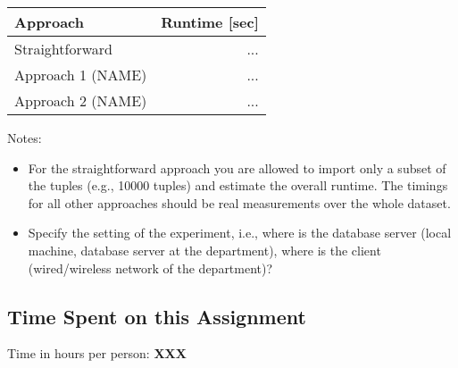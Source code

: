 \documentclass[11pt]{scrartcl}
\begin{document}
  \begin{table}[H]
  \begin{tabular}{l|r}
    Approach & Runtime [sec] \\
    \hline
    Straightforward & ... \\
    Approach 1 (NAME) & ... \\
    Approach 2 (NAME) & ...     
  \end{tabular}
  \end{table}

  \bigskip

  \noindent Notes:
  \begin{itemize}
  \item For the straightforward approach you are allowed to import
    only a subset of the tuples (e.g., 10000 tuples) and estimate the
    overall runtime. The timings for all other approaches should be
    real measurements over the whole dataset.
  \item Specify the setting of the experiment, i.e., where is the
    database server (local machine, database server at the
    department), where is the client (wired/wireless network of the
    department)?
\end{itemize}

  \subsection*{Time Spent on this Assignment}

  Time in hours per person: {\bf XXX}
\end{document}
